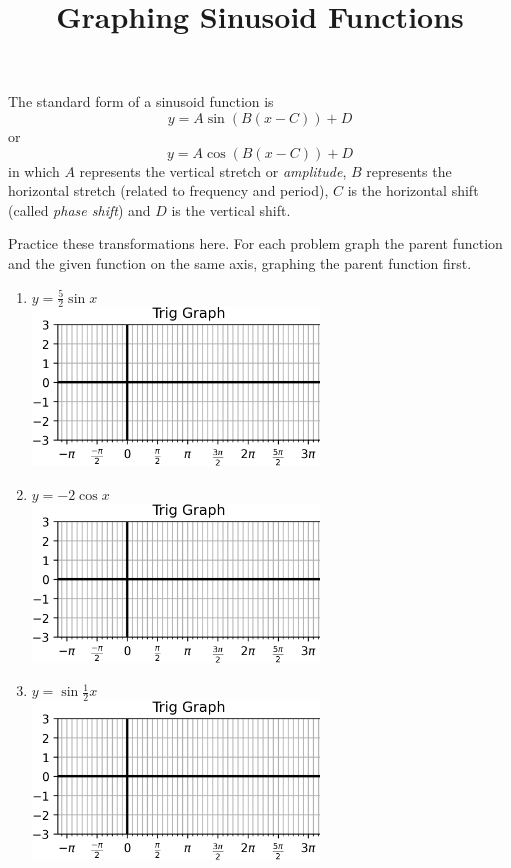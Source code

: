 \documentclass{article}
\begin{document}
\title{Graphing Sinusoid Functions}
\maketitle
\begin{multicols}{2}
The standard form of a sinusoid function is
$$ y = A \sin(B(x-C)) + D $$
or
$$ y = A \cos(B(x-C)) + D $$
in which $A$ represents the vertical stretch or
\textit{amplitude}, $B$ represents the horizontal stretch
(related to frequency and period), $C$ is the horizontal
shift (called \textit{phase shift}) and $D$ is the vertical shift.

Practice these transformations here. For each problem graph
the parent function and the given function on the same axis,
graphing the parent function first.

\begin{enumerate}
	\item $y=\frac52 \sin x$ \\
	\includegraphics*[width=3in]{Trig Graph.png}
	\item $y=-2 \cos x$ \\
	\includegraphics*[width=3in]{Trig Graph.png}
	\item $y=\sin \frac12 x$ \\
	\includegraphics*[width=3in]{Trig Graph.png}

\end{enumerate}
\end{multicols}
\end{document}
